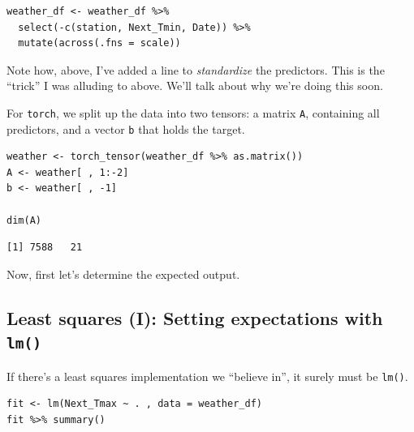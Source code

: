 \documentclass[
  letterpaper,
]{krantz}
\begin{document}
\begin{verbatim}
weather_df <- weather_df %>%
  select(-c(station, Next_Tmin, Date)) %>%
  mutate(across(.fns = scale))
\end{verbatim}

Note how, above, I've added a line to \emph{standardize} the predictors.
This is the ``trick'' I was alluding to above. We'll talk about why
we're doing this soon.

For \texttt{torch}, we split up the data into two tensors: a matrix
\texttt{A}, containing all predictors, and a vector \texttt{b} that
holds the target.

\begin{verbatim}
weather <- torch_tensor(weather_df %>% as.matrix())
A <- weather[ , 1:-2]
b <- weather[ , -1]

dim(A)
\end{verbatim}

\begin{verbatim}
[1] 7588   21
\end{verbatim}

Now, first let's determine the expected output.

\hypertarget{least-squares-i-setting-expectations-with-lm}{%
\subsection{\texorpdfstring{Least squares (I): Setting expectations with
\texttt{lm()}}{Least squares (I): Setting expectations with lm()}}\label{least-squares-i-setting-expectations-with-lm}}

If there's a least squares implementation we ``believe in'', it surely
must be \texttt{lm()}.

\begin{verbatim}
fit <- lm(Next_Tmax ~ . , data = weather_df)
fit %>% summary()
\end{verbatim}
\end{document}
